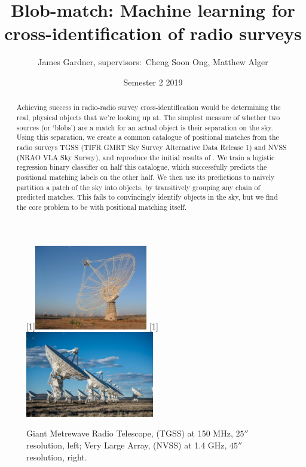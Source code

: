 \documentclass[12pt,a4paper]{article}
\title{Blob-match: Machine learning for cross-identification of radio surveys}
\author{James Gardner, supervisors:\ Cheng Soon Ong, Matthew Alger}
\date{Semester 2 2019}
\begin{document}
\maketitle

\begin{abstract}
    \noindent
    Achieving success in radio-radio survey cross-identification would be determining the real, physical objects that we're looking up at. The simplest measure of whether two sources (or `blobs') are a match for an actual object is their separation on the sky. Using this separation, we create a common catalogue of positional matches from the radio surveys TGSS (TIFR GMRT Sky Survey Alternative Data Release 1) and NVSS (NRAO VLA Sky Survey), and reproduce the initial results of \citet{posmatchpaper}. We train a logistic regression binary classifier on half this catalogue, which successfully predicts the positional matching labels on the other half. We then use its predictions to naively partition a patch of the sky into objects, by transitively grouping any chain of predicted matches. This fails to convincingly identify objects in the sky, but we find the core problem to be with positional matching itself.
\end{abstract}

\begin{figure}
    \centering
    \scalebox{-1}[1]{\includegraphics[width=0.44\textwidth]{pics/GMRT.pdf}} \;\;
    \scalebox{-1}[1]{\includegraphics[width=0.5\textwidth]{pics/VLA.pdf}}
    \caption{Giant Metrewave Radio Telescope, (TGSS) at 150 MHz, $\ang{;;25}$ resolution, left; Very Large Array, (NVSS) at 1.4 GHz, $\ang{;;45}$ resolution, right.}
    \label{fig:telescopes}
\end{figure}
\end{document}
